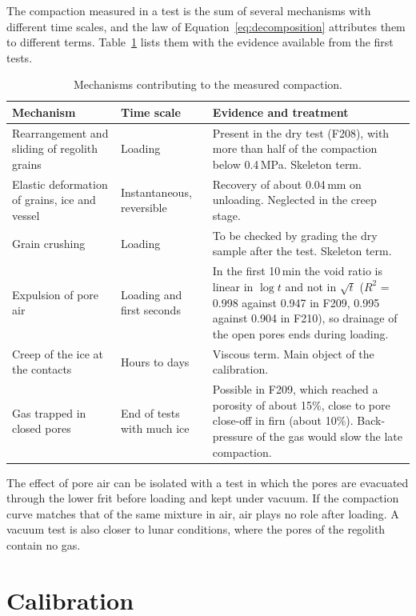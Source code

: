 The compaction measured in a test is the sum of several mechanisms with different time scales, and the law of Equation~\eqref{eq:decomposition} attributes them to different terms. Table~\ref{tab:mechanisms} lists them with the evidence available from the first tests.

\begin{table}[H]
\centering
\small
\begin{tabularx}{\textwidth}{@{}p{3.6cm}p{2.8cm}X@{}}
\toprule
Mechanism & Time scale & Evidence and treatment \\
\midrule
Rearrangement and sliding of regolith grains & Loading & Present in the dry test (F208), with more than half of the compaction below 0.4\,MPa. Skeleton term. \\
Elastic deformation of grains, ice and vessel & Instantaneous, reversible & Recovery of about 0.04\,mm on unloading. Neglected in the creep stage. \\
Grain crushing & Loading & To be checked by grading the dry sample after the test. Skeleton term. \\
Expulsion of pore air & Loading and first seconds & In the first 10\,min the void ratio is linear in $\log t$ and not in $\sqrt t$ ($R^2$ = 0.998 against 0.947 in F209, 0.995 against 0.904 in F210), so drainage of the open pores ends during loading. \\
Creep of the ice at the contacts & Hours to days & Viscous term. Main object of the calibration. \\
Gas trapped in closed pores & End of tests with much ice & Possible in F209, which reached a porosity of about 15\%, close to pore close-off in firn (about 10\%). Back-pressure of the gas would slow the late compaction. \\
\bottomrule
\end{tabularx}
\caption{Mechanisms contributing to the measured compaction.}
\label{tab:mechanisms}
\end{table}

The effect of pore air can be isolated with a test in which the pores are evacuated through the lower frit before loading and kept under vacuum. If the compaction curve matches that of the same mixture in air, air plays no role after loading. A vacuum test is also closer to lunar conditions, where the pores of the regolith contain no gas.

\section{Calibration}
\label{sec:calibration}
